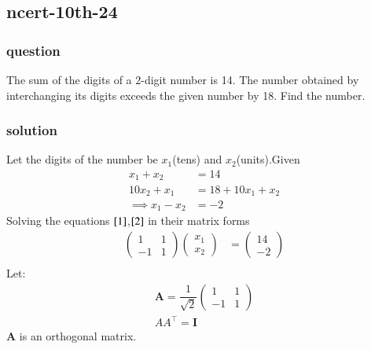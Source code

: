 \documentclass[journal,12pt,onecolumn]{IEEEtran}
\theoremstyle{remark}
\begin{document}
    \subsection{ncert-10th-24}
\subsubsection{question}
The sum of the digits of a $2$-digit number is 14. The number obtained by interchanging     its digits exceeds the given number by 18. Find the number.
\subsubsection{solution}
Let the digits of the number be $x_1$(tens) and $x_2$(units).Given
\begin{align}
    x_1+x_2 &= 14 \label{1}\\
    10x_2+x_1 &= 18 + 10x_1+x_2\\
    \implies x_1-x_2 &= -2\label{2}
\end{align}
Solving the equations $\eqref{1}$,$\eqref{2}$ in their matrix forms
\begin{align}
    \begin{pmatrix}
        1 & 1\\
        -1 & 1
    \end{pmatrix}
    \begin{pmatrix}
        x_1\\
        x_2
    \end{pmatrix} &= \begin{pmatrix}
        14\\
        -2
    \end{pmatrix}   \\
    \end{align}
    Let:
    \begin{align}
        \textbf{A}=\dfrac{1}{\sqrt{2}}\begin{pmatrix}
        1 & 1\\
        -1 & 1
    \end{pmatrix}\\
    AA^\top = \textbf{I}    
    \end{align}
    \textbf{A} is an orthogonal matrix.
\end{document}
